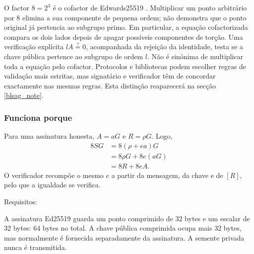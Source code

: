 O factor \(8=2^3\) é o cofactor de Edwards25519
\cite{Bernstein2012,rfc8032}. Multiplicar um ponto arbitrário por \(8\) elimina
a sua componente de pequena ordem; não demonstra que o ponto original já
pertencia ao subgrupo primo. Em particular, a equação cofactorizada compara os
dois lados depois de apagar possíveis componentes de torção.
Uma verificação explícita \(lA\stackrel{?}{=}0\), acompanhada da rejeição da
identidade, testa se a chave pública pertence ao subgrupo de ordem \(l\). Não é
sinónima de multiplicar toda a equação pelo cofactor. Protocolos e bibliotecas
podem escolher regras de validação mais estritas, mas signatário e verificador
têm de concordar exactamente nas mesmas regras. Esta distinção reaparecerá na
secção \ref{blsag_note}.



\subsubsection*{Funciona porque}

Para uma assinatura honesta, \(A=aG\) e \(R=\rho G\). Logo,
\begin{align*}
8SG&=8(\rho+ea)G\\
   &=8\rho G+8e(aG)\\
   &=8R+8eA.
\end{align*}
O verificador recompõe o mesmo \(e\) a partir da mensagem, da chave e de
\([R]\), pelo que a igualdade se verifica.



Requisitos:

A assinatura Ed25519 guarda um ponto comprimido de 32 bytes e um escalar de 32
bytes: 64 bytes no total. A chave pública comprimida ocupa mais 32 bytes, mas
normalmente é fornecida separadamente da assinatura. A semente privada nunca é
transmitida.

